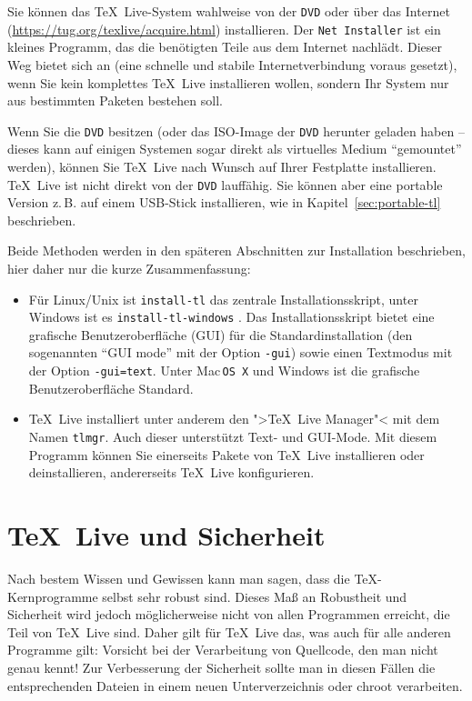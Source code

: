 \documentclass[12pt,ngerman,a4paper,fullparskip]{scrreprt}
\newcommand{\TL}{\TeX\ Live\xspace}
\newcommand{\acro}[1]{\texttt{#1}}
\newcommand{\cmdname}[1]{\texttt{#1}}
\newcommand{\code}[1]{\texttt{#1}}
\newcommand{\prog}[1]{\texttt{#1}}
\providecommand*{\DVD}{\acro{DVD}\xspace}
\providecommand*{\MacOSX}{Mac\,\acro{OS\,X}\xspace}
\begin{document}
Sie können das \TL-System wahlweise von der \DVD oder über das
Internet (\url{https://tug.org/texlive/acquire.html}) installieren.
Der \prog{Net Installer} ist ein kleines Programm,
das die benötigten Teile aus dem Internet nachlädt. Dieser Weg bietet
sich an (eine schnelle und stabile Internetverbindung voraus gesetzt),
wenn Sie kein komplettes \TL{} installieren wollen, sondern Ihr System nur
aus bestimmten Paketen bestehen soll.

Wenn Sie die \DVD{} besitzen (oder das ISO-Image der \DVD{} herunter
geladen haben -- dieses kann auf einigen Systemen sogar direkt als
virtuelles Medium \enquote{gemountet} werden), können Sie \TL{} nach
Wunsch auf Ihrer Festplatte installieren. \TL{} ist nicht direkt von der \DVD{} lauffähig. Sie können aber eine portable Version z.\,B. auf einem USB-Stick installieren, wie in Kapitel~\ref{sec:portable-tl} beschrieben.

Beide Methoden werden in den späteren Abschnitten zur Installation beschrieben, hier daher nur die kurze Zusammenfassung:

\begin{itemize}
\item Für Linux/Unix ist \cmdname{install-tl} das zentrale Installationsskript, unter Windows ist es \cmdname{install-tl-windows}  . Das Installationsskript bietet eine grafische Benutzeroberfläche (GUI) für die Standardinstallation  (den sogenannten \enquote{GUI mode} mit der Option \code{-gui}) sowie einen  Textmodus  mit der Option \code{-gui=text}. Unter \MacOSX und Windows ist die grafische Benutzeroberfläche Standard. 

\item \TL installiert unter anderem den ">\TL Manager"< mit dem Namen
\prog{tlmgr}. Auch dieser unterstützt Text- und GUI-Mode. Mit diesem
Programm können Sie einerseits Pakete von \TL installieren oder deinstallieren,
andererseits \TL konfigurieren.
\end{itemize}

\section{\TL und Sicherheit}

Nach bestem Wissen und Gewissen kann man sagen, dass die \TeX-Kernprogramme selbst sehr robust sind. Dieses Maß an Robustheit und Sicherheit wird jedoch möglicherweise nicht von allen Programmen erreicht, die Teil von \TL sind. Daher gilt für \TL das, was auch für alle anderen Programme gilt: Vorsicht bei der Verarbeitung von Quellcode, den man nicht genau kennt! Zur Verbesserung der Sicherheit sollte man in diesen Fällen die entsprechenden Dateien in einem neuen Unterverzeichnis oder chroot verarbeiten.
\end{document}
